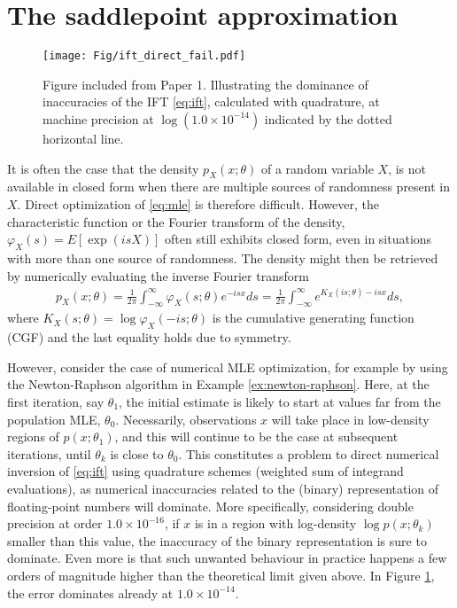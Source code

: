 \section{The saddlepoint approximation}
\begin{figure}[t!]
	\centering
	\texttt{[image: Fig/ift\_direct\_fail.pdf]}
	\caption{
	\label{fig:ift-direct-fail}
	Figure included from Paper 1. Illustrating the dominance of inaccuracies of the IFT \eqref{eq:ift}, calculated with quadrature, at machine precision at $\log(1.0\times 10^{-14})$ indicated by the dotted horizontal line.
	}
\end{figure}
It is often the case that the density $p_X(x;\theta)$ of a random variable $X$, is not available in closed form when there are multiple sources of randomness present in $X$.
Direct optimization of \eqref{eq:mle} is therefore difficult.
However, the characteristic function or the Fourier transform of the density, $\varphi_X(s)=E[\exp(isX)]$ often still exhibits closed form, even in situations with more than one source of randomness.
The density might then be retrieved by numerically evaluating the inverse Fourier transform
\begin{align}\label{eq:ift}
	p_X(x;\theta) = \frac{1}{2\pi} \int_{-\infty}^{\infty} \varphi_X(s;\theta)e^{-isx} ds
	= \frac{1}{2\pi} \int_{-\infty}^{\infty} e^{K_X(is;\theta)-isx} ds,
\end{align}
where $K_X(s;\theta)=\log\varphi_X(-is;\theta)$ is the cumulative generating function (CGF) and the last equality holds due to symmetry.

However, consider the case of numerical MLE optimization, for example by using the Newton-Raphson algorithm in Example \ref{ex:newton-raphson}. 
Here, at the first iteration, say $\theta_1$, the initial estimate is likely to start at values far from the population MLE, $\theta_0$.
Necessarily, observations $x$ will take place in low-density regions of $p(x;\theta_1)$, and this will continue to be the case at subsequent iterations, until $\theta_k$ is close to $\theta_0$.
This constitutes a problem to direct numerical inversion of \eqref{eq:ift} using quadrature schemes (weighted sum of integrand evaluations), as numerical inaccuracies related to the (binary) representation of floating-point numbers will dominate.
More specifically, considering double precision at order $1.0\times 10^{-16}$, if $x$ is in a region with log-density $\log p(x;\theta_k)$ smaller than this value, the inaccuracy of the binary representation is sure to dominate. Even more is that such unwanted behaviour in practice happens a few orders of magnitude higher than the theoretical limit given above. In Figure \ref{fig:ift-direct-fail}, the error dominates already at $1.0\times 10^{-14}$.


